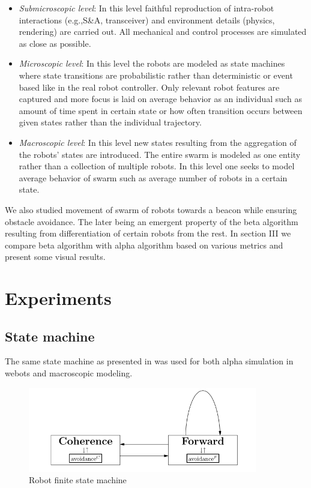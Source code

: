 \documentclass[a4paper, 10pt, conference]{ieeeconf}
\begin{document}
\begin{itemize}
  \item \textit{Submicroscopic level}: In this level faithful reproduction of intra-robot interactions (e.g.,S\&A, transceiver) and environment details (physics, rendering) are carried out.  All mechanical and control processes are simulated as close as possible.  
  \item \textit{Microscopic level}: In this level the robots are modeled as state machines where state transitions are probabilistic rather than deterministic or event based like in the real robot controller. Only relevant robot features are captured and more focus is laid on average behavior as an individual such as amount of time spent in certain state or how often transition occurs between given states rather than the individual trajectory.
  \item \textit{Macroscopic level}: In this level new states resulting from the aggregation of the robots’ states are introduced. The entire swarm is modeled as one entity rather than a collection of multiple robots. In this level one seeks to model average behavior of swarm such as average number of robots in a certain state.
\end{itemize}

  We also studied movement of swarm of robots towards a beacon while ensuring obstacle avoidance. The later being an emergent property of the beta algorithm resulting from differentiation of certain robots from the rest. In section III we compare beta algorithm with alpha algorithm based on various metrics and present some visual results.


\section{Experiments}
  \subsection{State machine}
  The same state machine as presented in \cite{Winfield08} was used for both alpha simulation in webots and macroscopic modeling. 


  \begin{figure}[!htbp]
    \begin{center}
      \includegraphics[width=10cm]{figures/fsm.png}
      \caption{Robot finite state machine \cite{Winfield08}}
    \end{center}
  \end{figure}
\end{document}
